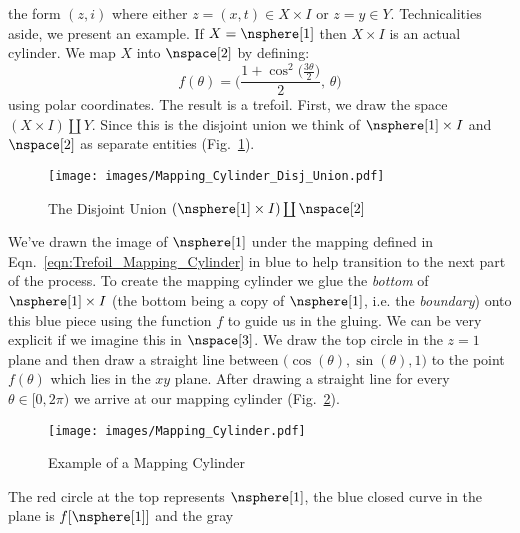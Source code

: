         the form $(z,i)$ where either $z=(x,t)\in{X}\times{I}$ or
        $z=y\in{Y}$. Technicalities aside, we present an example. If
        $X=\nsphere[1]$ then $X\times{I}$ is an actual cylinder. We map
        $X$ into $\nspace[2]$ by defining:
        \begin{equation}
            \label{eqn:Trefoil_Mapping_Cylinder}%
            f(\theta)=\Big(
                \frac{1+\cos^{2}\big(\frac{3\theta}{2}\big)}{2},\,
                \theta
            \Big)
        \end{equation}
        using polar coordinates. The result is a trefoil. First, we draw
        the space $(X\times{I})\coprod{Y}$. Since this is
        the disjoint union we think of $\nsphere[1]\times{I}$ and
        $\nspace[2]$ as separate entities
        (Fig.~\ref{fig:Ex_Mapping_Cylinder_Disj_Union}).
        \begin{figure}
            \centering
            \captionsetup{type=figure}
            \texttt{[image: images/Mapping\_Cylinder\_Disj\_Union.pdf]}
            \caption{The Disjoint Union
                     $(\nsphere[1]\times{I})\coprod\nspace[2]$}
            \label{fig:Ex_Mapping_Cylinder_Disj_Union}
        \end{figure}
        We've drawn the image of $\nsphere[1]$ under the mapping
        defined in Eqn.~\ref{eqn:Trefoil_Mapping_Cylinder} in blue to
        help transition to the next part of the process. To create the
        mapping cylinder we glue the \textit{bottom} of
        $\nsphere[1]\times{I}$ (the bottom being a copy of
        $\nsphere[1]$, i.e. the \textit{boundary}) onto this blue piece
        using the function $f$ to guide us in the gluing. We can be very
        explicit if we imagine this in $\nspace[3]$. We draw the top
        circle in the $z=1$ plane and then draw a straight line between
        $\big(\cos(\theta),\sin(\theta),1\big)$ to the point $f(\theta)$
        which lies in the $xy$ plane. After drawing a straight line for
        every $\theta\in[0,2\pi)$ we arrive at our mapping cylinder
        (Fig.~\ref{fig:Ex_Mapping_Cylinder}).
        \begin{figure}[H]
            \centering
            \captionsetup{type=figure}
            \texttt{[image: images/Mapping\_Cylinder.pdf]}
            \caption{Example of a Mapping Cylinder}
            \label{fig:Ex_Mapping_Cylinder}
        \end{figure}
        The red circle at the top represents $\nsphere[1]$, the blue
        closed curve in the plane is $f[\nsphere[1]]$ and the gray
